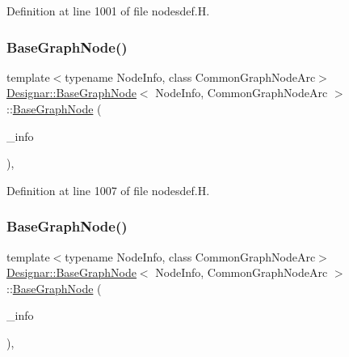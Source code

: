 Definition at line 1001 of file nodesdef.\+H.

\mbox{\label{class_designar_1_1_base_graph_node_ada20ee8b29e8372f93b7deb6a93c2be1}} 
\subsubsection{\texorpdfstring{Base\+Graph\+Node()}{BaseGraphNode()}\hspace{0.1cm}{\footnotesize\ttfamily [2/4]}}
{\footnotesize\ttfamily template$<$typename Node\+Info, class Common\+Graph\+Node\+Arc$>$ \\
\hyperlink{class_designar_1_1_base_graph_node}{Designar\+::\+Base\+Graph\+Node}$<$ Node\+Info, Common\+Graph\+Node\+Arc $>$\+::\hyperlink{class_designar_1_1_base_graph_node}{Base\+Graph\+Node} (\begin{DoxyParamCaption}\item[{const Node\+Info \&}]{\+\_\+info }\end{DoxyParamCaption})\hspace{0.3cm}{\ttfamily [inline]}, {\ttfamily [protected]}}



Definition at line 1007 of file nodesdef.\+H.

\mbox{\label{class_designar_1_1_base_graph_node_a3e36c23ee7f22345b2ebbad09304dca0}} 
\subsubsection{\texorpdfstring{Base\+Graph\+Node()}{BaseGraphNode()}\hspace{0.1cm}{\footnotesize\ttfamily [3/4]}}
{\footnotesize\ttfamily template$<$typename Node\+Info, class Common\+Graph\+Node\+Arc$>$ \\
\hyperlink{class_designar_1_1_base_graph_node}{Designar\+::\+Base\+Graph\+Node}$<$ Node\+Info, Common\+Graph\+Node\+Arc $>$\+::\hyperlink{class_designar_1_1_base_graph_node}{Base\+Graph\+Node} (\begin{DoxyParamCaption}\item[{Node\+Info \&\&}]{\+\_\+info }\end{DoxyParamCaption})\hspace{0.3cm}{\ttfamily [inline]}, {\ttfamily [protected]}}



